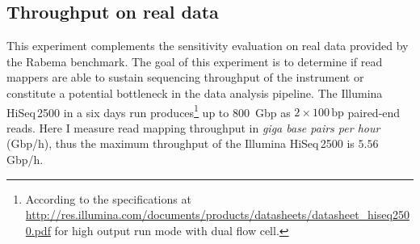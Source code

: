 

\begin{table*}[t]
  \caption[Yara results in the Rabema benchmark]
  {
  \label{tab:yara:rabema}
    Rabema benchmark results on the human whole genome.
    The left panel shows the results of mapping $1\,\text{M}$ Illumina-like $2 \times 100\,\text{bp}$ simulated reads; the right panel shows the results of mapping $1\,\text{M}$ Illumina $2 \times 100\,\text{bp}$ real reads.
    Big numbers show total Rabema scores, while small numbers show marginal scores for the mapping locations at
    $\bigl(\begin{smallmatrix}\mbox{\tiny 0}&\mbox{\tiny 1}&\mbox{\tiny 2}\\\mbox{\tiny 3}&\mbox{\tiny 4}&\mbox{\tiny 5}\end{smallmatrix}\bigr)$ \% error rate.
    }
  \vspace{-3mm}
  \center
  \sffamily
  \resizebox{0.95\textwidth}{!}
  {
	\renewcommand{\tabcolsep}{0.8ex}
	
  }
\end{table*}


\subsection{Throughput on real data}

This experiment complements the sensitivity evaluation on real data provided by the Rabema benchmark.
The goal of this experiment is to determine if read mappers are able to sustain sequencing throughput of the instrument or constitute a potential bottleneck in the data analysis pipeline.
The Illumina HiSeq\,2500 in a six days run produces\footnote{According to the specifications at \url{http://res.illumina.com/documents/products/datasheets/datasheet_hiseq2500.pdf} for high output run mode with dual flow cell.} up to 800~Gbp as $2 \times 100\,\text{bp}$ paired-end reads.
Here I measure read mapping throughput in \emph{giga base pairs per hour} (Gbp/h), thus the maximum throughput of the Illumina HiSeq\,2500 is $5.56$ Gbp/h.


